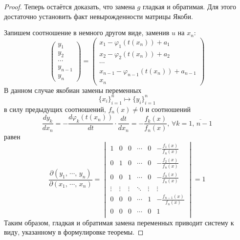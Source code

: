 \documentclass[a4paper,12pt]{article}
\renewcommand{\phi}{\ensuremath{\varphi}}
\theoremstyle{plain}
\theoremstyle{definition}
\theoremstyle{remark}
\begin{document}
\begin{proof}
	Теперь остаётся доказать, что замена $g$ гладкая и обратимая. Для этого достаточно установить факт невырожденности матрицы Якоби.

	Запишем соотношение в немного другом виде, заменив $u$ на $x_n$:
	\[\begin{pmatrix}
			y_1     \\
			y_2     \\
			\cdots  \\
			y_{n-1} \\
			y_n
		\end{pmatrix} = \begin{pmatrix}
			x_1 - \phi_1(t(x_n)) + a_1             \\
			x_2 - \phi_2(t(x_n)) + a_2             \\
			\cdots                                 \\
			x_{n-1} - \phi_{n-1}(t(x_n)) + a_{n-1} \\
			x_n
		\end{pmatrix}\]
	В данном случае якобиан замены переменных
	\[\{x_i\}_{i = 1}^n \mapsto \{y_i\}_{i = 1}^n\]
	в силу предыдущих соотношений, $f_n(x) \neq 0$ и соотношений
	\[\frac{dy_k}{dx_n} = -\frac{d\phi_k(t(x_n))}{dt}\cdot \frac{dt}{dx_n} = -\frac{f_k(x)}{f_n(x)},\, \forall k = \overline{1,\,n-1}\]
	равен
	\[\frac{\partial(y_1,\,\cdots,\,y_n)}{\partial(x_1,\,\cdots,\,x_n)} = \begin{vmatrix}
			1      & 0      & 0      & \cdots & 0      & -\frac{f_1(x)}{f_n(x)}     \\
			0      & 1      & 0      & \cdots & 0      & -\frac{f_2(x)}{f_n(x)}     \\
			0      & 0      & 1      & \cdots & 0      & -\frac{f_3(x)}{f_n(x)}     \\
			\vdots & \vdots & \vdots & \ddots & \vdots & \vdots                     \\
			0      & 0      & 0      & \cdots & 1      & -\frac{f_{n-1}(x)}{f_n(x)} \\
			0      & 0      & 0      & \cdots & 0      & 1                          \\
		\end{vmatrix} = 1\]
	Таким образом, гладкая и обратимая замена переменных приводит систему к виду, указанному в формулировке теоремы.
\end{proof}
\end{document}
